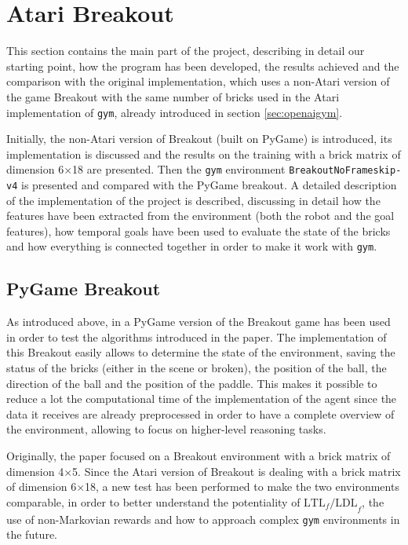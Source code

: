 \section{Atari Breakout}
\label{section:ataribreakout}
This section contains the main part of the project, describing in detail our
starting point, how the program has been developed, the results achieved and the
comparison with the original implementation, which uses a non-Atari version
of the game Breakout \cite{DBLP:journals/corr/abs-1807-06333} with the same
number of bricks used in the Atari implementation of \texttt{gym},
already introduced in section \ref{sec:openaigym}.

Initially, the non-Atari version of Breakout (built on PyGame) is introduced,
its implementation is discussed and the results on the training with a brick
matrix of dimension 6$\times$18 are presented. Then the \texttt{gym}
environment \texttt{BreakoutNoFrameskip-v4} is presented and compared with the
PyGame breakout. A detailed description of the implementation of the project
is described, discussing in detail how the features have been extracted from
the environment (both the robot and the goal features), how temporal goals
have been used to evaluate the state of the bricks and how everything is
connected together in order to make it work with \texttt{gym}.

\subsection{PyGame Breakout}
As introduced above, in \cite{DBLP:journals/corr/abs-1807-06333} a PyGame
version of the Breakout game has been used in order to test the algorithms
introduced in the paper. The implementation of this Breakout easily allows
to determine the state of the environment, saving the status of the bricks
(either in the scene or broken), the position of the ball, the direction of
the ball and the position of the paddle. This makes it possible to reduce
a lot the computational time of the implementation of the agent since the
data it receives are already preprocessed in order to have a complete
overview of the environment, allowing to focus on higher-level reasoning
tasks.

Originally, the paper focused on a Breakout environment with a brick matrix
of dimension 4$\times$5. Since the Atari version of Breakout is dealing with
a brick matrix of dimension 6$\times$18, a new test has been performed to
make the two environments comparable, in order to better understand the
potentiality of $\text{LTL}_f\text{/LDL}_f$, the use of non-Markovian rewards
and how to approach complex \texttt{gym} environments in the future.

